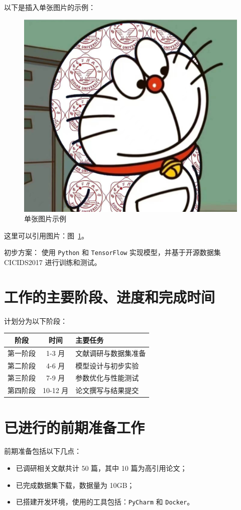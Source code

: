 \documentclass{xduugtp}
\renewcommand{\figurename}{图} %
\begin{document}
以下是插入单张图片的示例：

\begin{figure}[H] %
\centering
\includegraphics[width=0.6\linewidth]{whatever.jpg} %
\caption{单张图片示例} %
\label{fig:single} %
\end{figure}

这里可以引用图片：\figurename~\ref{fig:single}。

初步方案：  
使用 \texttt{Python} 和 \texttt{TensorFlow} 实现模型，并基于开源数据集 CICIDS2017 进行训练和测试。

\section{工作的主要阶段、进度和完成时间}
计划分为以下阶段：
\begin{tabular}{|c|c|l|}
    \hline
    \textbf{阶段} & \textbf{时间} & \textbf{主要任务} \\
    \hline
    第一阶段 & 1-3 月 & 文献调研与数据集准备 \\
    第二阶段 & 4-6 月 & 模型设计与初步实验 \\
    第三阶段 & 7-9 月 & 参数优化与性能测试 \\
    第四阶段 & 10-12 月 & 论文撰写与结果提交 \\
    \hline
\end{tabular}

\section{已进行的前期准备工作}
前期准备包括以下几点：
\begin{itemize}
    \item 已调研相关文献共计 50 篇，其中 10 篇为高引用论文；
    \item 已完成数据集下载，数据量为 10GB；
    \item 已搭建开发环境，使用的工具包括：\texttt{PyCharm} 和 \texttt{Docker}。
\end{itemize}
\end{document}
